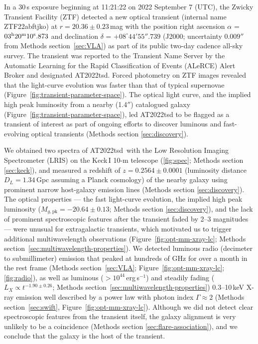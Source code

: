 \documentclass{nature_plusfigure}
\newcommand{\at}{AT2022tsd}
\begin{document}
In a 30\,s exposure beginning at 11:21:22 on 2022 September 7 (UTC), the Zwicky Transient Facility (ZTF\cite{Graham2019,Bellm2019}) detected a new optical transient (internal name ZTF22abftjko) at $r=20.36\pm0.23\,$mag with the position right ascension $\alpha$ = $03^{\rm{h}}20^{\rm{m}}10^{\rm{s}}.873$ and declination $\delta$ = $+08^{\circ} 44' 55''.739$ 
(J2000; uncertainty $0.009''$ from Methods section~\ref{sec:VLA}) as part of its public two-day cadence all-sky survey.
The transient was reported\cite{Munoz-Arancibia2022} to the Transient Name Server by the Automatic Learning for the Rapid Classification of Events (ALeRCE) Alert Broker\cite{Forster2021} and designated AT2022tsd.
Forced photometry on ZTF images\cite{Masci2019} revealed that the light-curve evolution was faster than that of typical supernovae (Figure~\ref{fig:transient-parameter-space}).
The optical light curve, and the implied high peak luminosity from a nearby (1.4$''$) catalogued\cite{Beck2021} galaxy (Figure~\ref{fig:transient-parameter-space}), led AT2022tsd to be flagged as a transient of interest as part of ongoing efforts to discover luminous and fast-evolving optical transients (Methods section \ref{sec:discovery}).

We obtained two spectra of \at\ with the Low Resolution Imaging Spectrometer (LRIS\cite{Oke1995}) on the Keck\,I 10-m telescope (\ref{fig:spec}; Methods section \ref{sec:keck}), and measured\cite{Ho2022_Astronote_Keck} a redshift of $z=0.2564\pm0.0001$ (luminosity distance $D_L=1.34\,$Gpc assuming a Planck cosmology\cite{Planck2020}) of the nearby galaxy using prominent narrow host-galaxy emission lines (Methods section \ref{sec:discovery}). 
The optical properties --- the fast light-curve evolution, the implied high peak luminosity ($M_{g,\mathrm{pk}}=-20.64\pm0.13$; Methods section \ref{sec:discovery}), and the lack of prominent spectroscopic features after the transient faded by 2--3 magnitudes --- were unusual for extragalactic transients, which motivated us to trigger additional multiwavelength observations (Figure~\ref{fig:opt-mm-xray-lc}; Methods section~\ref{sec:multiwavelength-properties}).
We detected luminous radio (decimeter\cite{Ho2022Astronote_radio} to submillimeter) emission that peaked at hundreds of GHz for over a month in the rest frame (Methods section~\ref{sec:VLA}; Figure~\ref{fig:opt-mm-xray-lc}; \ref{fig:radio}),
as well as luminous ($>10^{44}\,$erg\,s$^{-1}$) and steadily fading ($L_X\propto t^{-1.90\pm0.26}$; Methods section~\ref{sec:multiwavelength-properties}) 0.3--10\,keV X-ray emission\cite{Schulze2022Astronote_xray} well described by a power law with photon index $\Gamma\approx2$ (Methods section~\ref{sec:swift}, Figure~\ref{fig:opt-mm-xray-lc}).
Although we did not detect clear spectroscopic features from the transient itself, the galaxy alignment is very unlikely to be a coincidence (Methods section \ref{sec:flare-association}), and we conclude that the galaxy is the host of the transient.
\end{document}
